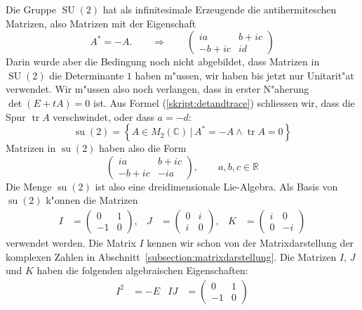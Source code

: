 \begin{beispiel}
Die Gruppe $\operatorname{SU}(2)$ hat als infinitesimale Erzeugende 
die antihermiteschen Matrizen, also Matrizen mit der Eigenschaft
\[
A^*=-A.
\qquad
\Rightarrow
\qquad
\begin{pmatrix}
   ia&b+ic\\
-b+ic&  id
\end{pmatrix}
\]
Darin wurde aber die Bedingung noch nicht abgebildet, dass Matrizen
in $\operatorname{SU}(2)$ die Determinante $1$ haben m"ussen, wir
haben bis jetzt nur Unitarit"at verwendet. Wir m"ussen also noch
verlangen, dass in erster N"aherung $\det(E+tA)=0$ ist.
Aus Formel (\ref{skript:detandtrace}) schliessen wir, dass die Spur
$\operatorname{tr}A$ verschwindet, oder dass $a=-d$:
\begin{equation}
\operatorname{su}(2)
=
\left\{ A\in M_2(\mathbb C)\,|\,
A^*=-A\wedge \operatorname{tr}A=0
\right\}
\end{equation}
Matrizen in $\operatorname{su}(2)$ haben also die Form
\begin{equation}
\begin{pmatrix}
   ia&b+ic\\
-b+ic& -ia
\end{pmatrix},\qquad a,b,c\in\mathbb R
\end{equation}
Die Menge $\operatorname{su}(2)$ ist also eine dreidimensionale 
Lie-Algebra.
Als Basis von $\operatorname{su}(2)$ k"onnen die Matrizen
\begin{align}
I
&=
\begin{pmatrix} 0&1 \\ -1& 0 \end{pmatrix},
&
J
&=
\begin{pmatrix} 0&i \\  i& 0 \end{pmatrix},
&
K
&=
\begin{pmatrix} i&0 \\  0&-i \end{pmatrix}
\label{skript:komplex:definitionIJK}
\end{align}
verwendet werden.
Die Matrix $I$ kennen wir schon von der Matrixdarstellung der komplexen
Zahlen in Abschnitt~\ref{subsection:matrixdarstellung}.
Die Matrizen $I$, $J$ und $K$ haben die folgenden algebraischen
Eigenschaften:
\begin{align*}
I^2
&=
-E
&
IJ
&=
\begin{pmatrix} 0&1 \\ -1& 0 \end{pmatrix}

\end{align*}
\end{beispiel}
